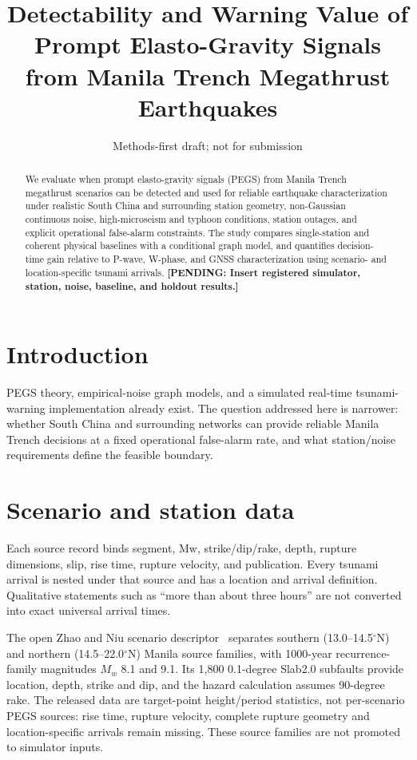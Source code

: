 \documentclass[11pt]{article}
\title{Detectability and Warning Value of Prompt Elasto-Gravity Signals from Manila Trench Megathrust Earthquakes}
\author{\PEGSPending{author list, station operators, and warning partners}}
\date{Methods-first draft; not for submission}
\newcommand{\PEGSPending}[1]{\textbf{[PENDING: #1]}}
\begin{document}
\maketitle

\begin{abstract}
We evaluate when prompt elasto-gravity signals (PEGS) from Manila Trench
megathrust scenarios can be detected and used for reliable earthquake
characterization under realistic South China and surrounding station geometry,
non-Gaussian continuous noise, high-microseism and typhoon conditions, station
outages, and explicit operational false-alarm constraints. The study compares
single-station and coherent physical baselines with a conditional graph model,
and quantifies decision-time gain relative to P-wave, W-phase, and GNSS
characterization using scenario- and location-specific tsunami arrivals.
\PEGSPending{Insert registered simulator, station, noise, baseline, and holdout
results.}
\end{abstract}

\section{Introduction}
PEGS theory, empirical-noise graph models, and a simulated real-time tsunami-
warning implementation already exist. The question addressed here is narrower:
whether South China and surrounding networks can provide reliable Manila Trench
decisions at a fixed operational false-alarm rate, and what station/noise
requirements define the feasible boundary.

\section{Scenario and station data}
Each source record binds segment, Mw, strike/dip/rake, depth, rupture dimensions,
slip, rise time, rupture velocity, and publication. Every tsunami arrival is
nested under that source and has a location and arrival definition. Qualitative
statements such as ``more than about three hours'' are not converted into exact
universal arrival times.

The open Zhao and Niu scenario descriptor~\cite{Zhao2025} separates southern
(13.0--14.5$^\circ$N) and northern (14.5--22.0$^\circ$N) Manila source families,
with 1000-year recurrence-family magnitudes $M_w$ 8.1 and 9.1. Its 1,800
0.1-degree Slab2.0 subfaults provide location, depth, strike and dip, and the
hazard calculation assumes 90-degree rake. The released data are target-point
height/period statistics, not per-scenario PEGS sources: rise time, rupture
velocity, complete rupture geometry and location-specific arrivals remain
missing. These source families are not promoted to simulator inputs.
\end{document}
